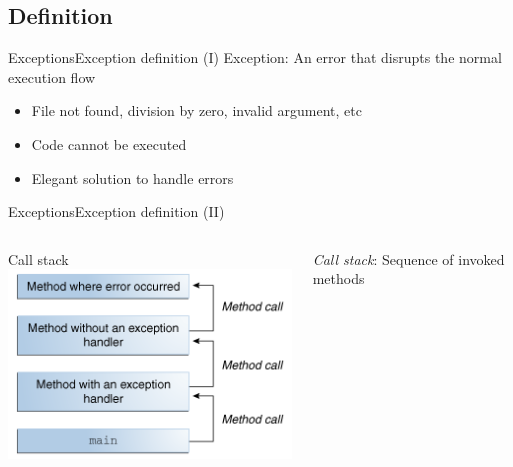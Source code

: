 \documentclass[10pt,compress]{beamer} %
\begin{document}
\subsection{Definition}

\begin{frame}[fragile]{Exceptions}{Exception definition (I)}
	\alert{Exception}: An error that disrupts the normal execution flow
	\begin{itemize}
		\item File not found, division by zero, invalid argument, etc
		\item Code cannot be executed
		\item Elegant solution to handle errors
	\end{itemize}
\end{frame}

\begin{frame}{Exceptions}{Exception definition (II)}
    \begin{columns}
		\centering Call stack
		\centering \includegraphics[width=0.8\linewidth]{figs/exceptions-callstack.png}

		\textit{Call stack}: Sequence of invoked methods
	\end{columns}
\end{frame}
\end{document}
